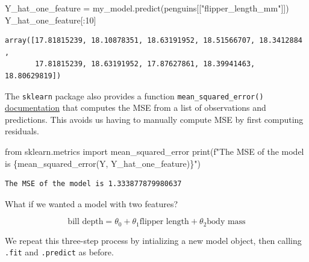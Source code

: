 \documentclass[
  letterpaper,
  DIV=11,
  numbers=noendperiod]{scrreprt}
\newenvironment{Shaded}{\begin{snugshade}}{\end{snugshade}}
\newcommand{\BuiltInTok}[1]{\textcolor[rgb]{0.00,0.23,0.31}{#1}}
\newcommand{\DecValTok}[1]{\textcolor[rgb]{0.68,0.00,0.00}{#1}}
\newcommand{\ImportTok}[1]{\textcolor[rgb]{0.00,0.46,0.62}{#1}}
\newcommand{\NormalTok}[1]{\textcolor[rgb]{0.00,0.23,0.31}{#1}}
\newcommand{\OperatorTok}[1]{\textcolor[rgb]{0.37,0.37,0.37}{#1}}
\newcommand{\SpecialCharTok}[1]{\textcolor[rgb]{0.37,0.37,0.37}{#1}}
\newcommand{\SpecialStringTok}[1]{\textcolor[rgb]{0.13,0.47,0.30}{#1}}
\newcommand{\StringTok}[1]{\textcolor[rgb]{0.13,0.47,0.30}{#1}}
\begin{document}
\begin{Shaded}
\begin{Highlighting}[]
\NormalTok{Y\_hat\_one\_feature }\OperatorTok{=}\NormalTok{ my\_model.predict(penguins[[}\StringTok{"flipper\_length\_mm"}\NormalTok{]])}
\NormalTok{Y\_hat\_one\_feature[:}\DecValTok{10}\NormalTok{]}
\end{Highlighting}
\end{Shaded}

\begin{verbatim}
array([17.81815239, 18.10878351, 18.63191952, 18.51566707, 18.3412884 ,
       17.81815239, 18.63191952, 17.87627861, 18.39941463, 18.80629819])
\end{verbatim}

The \texttt{sklearn} package also provides a function
\texttt{mean\_squared\_error()}
\href{https://scikit-learn.org/stable/modules/generated/sklearn.metrics.mean_squared_error.html}{documentation}
that computes the MSE from a list of observations and predictions. This
avoids us having to manually compute MSE by first computing residuals.

\begin{Shaded}
\begin{Highlighting}[]
\ImportTok{from}\NormalTok{ sklearn.metrics }\ImportTok{import}\NormalTok{ mean\_squared\_error}
\BuiltInTok{print}\NormalTok{(}\SpecialStringTok{f"The MSE of the model is }\SpecialCharTok{\{}\NormalTok{mean\_squared\_error(Y, Y\_hat\_one\_feature)}\SpecialCharTok{\}}\SpecialStringTok{"}\NormalTok{)}
\end{Highlighting}
\end{Shaded}

\begin{verbatim}
The MSE of the model is 1.333877879980637
\end{verbatim}

What if we wanted a model with two features?

\[\text{bill depth} = \theta_0 + \theta_1 \text{flipper length} + \theta_2 \text{body mass}\]

We repeat this three-step process by intializing a new model object,
then calling \texttt{.fit} and \texttt{.predict} as before.
\end{document}
